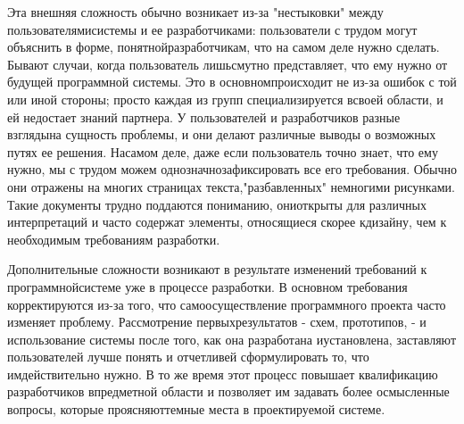 \documentclass[10pt]{article}
\begin{document}
Эта внешняя сложность обычно возникает из-за "нестыковки" между пользователями\linebreak  системы и ее разработчиками: пользователи с трудом могут объяснить в форме, понятной\linebreak  разработчикам, что на самом деле нужно сделать. Бывают случаи, когда пользователь лишь\linebreak  смутно представляет, что ему нужно от будущей программной системы. Это в основном\linebreak  происходит не из-за ошибок с той или иной стороны; просто каждая из групп специализируется в\linebreak  своей области, и ей недостает знаний партнера. У пользователей и разработчиков разные взгляды\linebreak  на сущность проблемы, и они делают различные выводы о возможных путях ее решения. На\linebreak  самом деле, даже если пользователь точно знает, что ему нужно, мы с трудом можем однозначно\linebreak  зафиксировать все его требования. Обычно они отражены на многих страницах текста,\linebreak  "разбавленных" немногими рисунками. Такие документы трудно поддаются пониманию, они\linebreak  открыты для различных интерпретаций и часто содержат элементы, относящиеся скорее к\linebreak  дизайну, чем к необходимым требованиям разработки.
 
Дополнительные сложности возникают в результате изменений требований к программной\linebreak  системе уже в процессе разработки. В основном требования корректируются из-за того, что само\linebreak  осуществление программного проекта часто изменяет проблему. Рассмотрение первых\linebreak  результатов - схем, прототипов, - и использование системы после того, как она разработана и\linebreak  установлена, заставляют пользователей лучше понять и отчетливей сформулировать то, что им\linebreak  действительно нужно. В то же время этот процесс повышает квалификацию разработчиков в\linebreak  предметной области и позволяет им задавать более осмысленные вопросы, которые проясняют\linebreak  темные места в проектируемой системе. 
\end{document}
